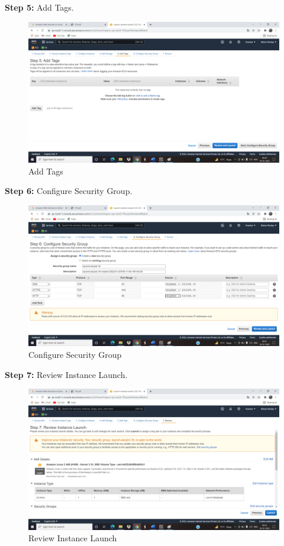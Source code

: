 \documentclass[12pt]{article}
\begin{document}
\textbf{Step 5:} Add Tags.
\begin{figure}[h]
\centering
\includegraphics[scale=0.265]{Untitled10.png}
\caption{Add Tags}
\label{Add Tags}
\end{figure}
\clearpage

\textbf{Step 6:} Configure Security Group.
\begin{figure}[h]
\centering
\includegraphics[scale=0.265]{Untitled11.png}
\caption{Configure Security Group}
\label{Configure Security Group}
\end{figure}

\textbf{Step 7:} Review Instance Launch.
\begin{figure}[h]
\centering
\includegraphics[scale=0.265]{Untitled12.png}
\caption{Review Instance Launch}
\label{Review Instance Launch}
\end{figure}
\clearpage
\end{document}
